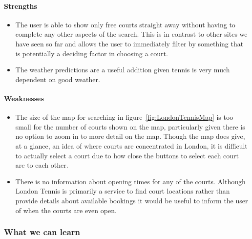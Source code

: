 \paragraph{Strengths}
\begin{itemize}
	\item The user is able to show only free courts straight away without
		having to complete any other aspects of the search. This is in contrast
		to other sites we have seen so far and allows the user to immediately
		filter by something that is potentially a deciding factor in choosing a
		court.
	\item The weather predictions are a useful addition given tennis is very
		much dependent on good weather.
\end{itemize}

\paragraph{Weaknesses}
\begin{itemize}
	\item The size of the map for searching in figure~\ref{fig:LondonTennisMap}
		is too small for the number of courts shown on the map, particularly
		given there is no option to zoom in to more detail on the map. Though
		the map does give, at a glance, an idea of where courts are
		concentrated in London, it is difficult to actually select a court due
		to how close the buttons to select each court are to each other.
	\item There is no information about opening times for any of the courts.
		Although London Tennis is primarily a service to find court locations
		rather than provide details about available bookings it would be useful
		to inform the user of when the courts are even open.
\end{itemize}

\subsubsection{What we can learn}
\label{ssub:what_we_can_learn}

